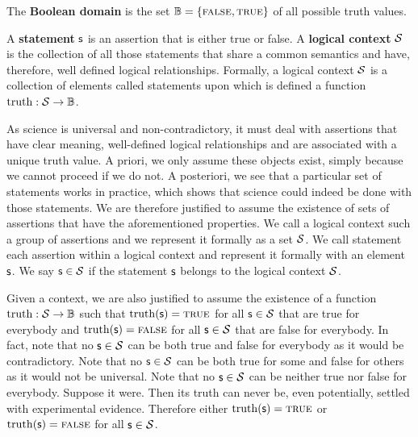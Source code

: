 \begin{mathSection}
	\begin{defn}
		The \textbf{Boolean domain} is the set $\mathbb{B} = \{\textup{\textsc{false}}, \textup{\textsc{true}}\}$ of all possible truth values.
	\end{defn}
	
	
	\begin{axiom}\label{pm-vs-axiomContext}
		A \textbf{statement} $\mathsf{s}$ is an assertion that is either true or false. A \textbf{logical context} $\mathcal{S}$ is the collection of all those statements that share a common semantics and have, therefore, well defined logical relationships. Formally, a logical context $\mathcal{S}$ is a collection of elements called statements upon which is defined a function $\operatorname{truth}: \mathcal{S} \to \mathbb{B}$.
	\end{axiom}
	
	\begin{justification}
		As science is universal and non-contradictory, it must deal with assertions that have clear meaning, well-defined logical relationships and are associated with a unique truth value. A priori, we only assume these objects exist, simply because we cannot proceed if we do not. A posteriori, we see that a particular set of statements works in practice, which shows that science could indeed be done with those statements. We are therefore justified to assume the existence of sets of assertions that have the aforementioned properties. We call a logical context such a group of assertions and we represent it formally as a set $\mathcal{S}$. We call statement each assertion within a logical context and represent it formally with an element $\mathsf{s}$. We say $\mathsf{s} \in \mathcal{S}$ if the statement $\mathsf{s}$ belongs to the logical context $\mathcal{S}$.
		
		Given a context, we are also justified to assume the existence of a function $\operatorname{truth} : \mathcal{S} \to \mathbb{B}$ such that $\operatorname{truth}(\mathsf{s}) = \textup{\textsc{true}}$ for all $\mathsf{s} \in \mathcal{S}$ that are true for everybody and $\operatorname{truth}(\mathsf{s}) = \textup{\textsc{false}}$ for all $\mathsf{s} \in \mathcal{S}$ that are false for everybody. In fact, note that no $\mathsf{s} \in \mathcal{S}$ can be both true and false for everybody as it would be contradictory. Note that no $\mathsf{s} \in \mathcal{S}$ can be both true for some and false for others as it would not be universal. Note that no $\mathsf{s} \in \mathcal{S}$ can be neither true nor false for everybody. Suppose it were. Then its truth can never be, even potentially, settled with experimental evidence. Therefore either $\operatorname{truth}(\mathsf{s}) = \textup{\textsc{true}}$ or $\operatorname{truth}(\mathsf{s}) = \textup{\textsc{false}}$ for all $\mathsf{s} \in \mathcal{S}$.
		

\end{justification}
\end{mathSection}
